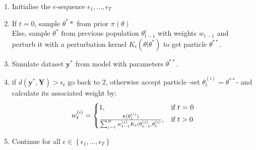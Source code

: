 \documentclass[12pt,a4paper,titlepage]{article}
\begin{document}
\begin{enumerate}[noitemsep]
\item{Initialise the $\epsilon$-sequence $\epsilon_{1}, \dots, \epsilon_{T}$}
\item{If $t=0$, sample $\theta^**$ from prior $\pi(\theta)$\\
Else, sample $\theta^*$ from previous population $\theta_{t-1}^{i}$ with weights $w_{t-1}$ and perturb it with a perturbation kernel $K_{t}(\theta|\theta^*) $ to get particle $\theta^{**}$.}
\item{Simulate dataset $\mathbf{y}^*$ from model with parameters $\theta^{**}$.}
\item{if $d(\mathbf{y}^*, \mathbf{Y}) > \epsilon_{t}$ go back to 2, otherwise accept particle -set $\theta_{t}^{(i)} = \theta^{**}$- and calculate its associated weight by:
\begin{equation*}
w_{t}^{(i)} = \begin{cases} 1, & \mbox{if } t\mbox{ = 0} \\ \frac{\pi(\theta_{t}^{(i)})}{\sum_{j-1}^N w_{t-1}^{(j)}K_{t}(\theta_{t-1}^{(j)}, \theta_{t}^{(i)}} , & \mbox{if } \mbox{$ t > 0$} \end{cases}
\end{equation*} }
\item{Continue for all $\epsilon \in \left\{{\epsilon_{1}, \dots, \epsilon_{T}}\right\}$}
\end{enumerate}
\end{document}
